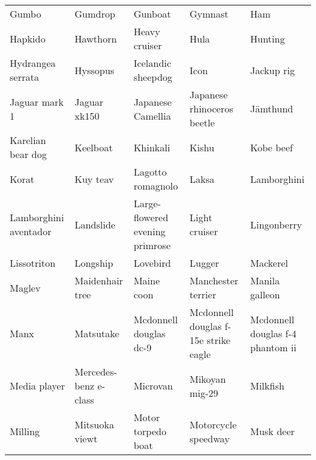 \documentclass[10pt,journal,compsoc]{IEEEtran}
\begin{document}
\begin{table*}[!h]
\begin{tabular}{lllll}
Gumbo                     & Gumdrop                         & Gunboat                           & Gymnast                                    & Ham                                \\
Hapkido                   & Hawthorn                        & Heavy cruiser                     & Hula                                       & Hunting                            \\
Hydrangea serrata         & Hyssopus                        & Icelandic sheepdog                & Icon                                       & Jackup rig                         \\
Jaguar mark 1             & Jaguar xk150                    & Japanese Camellia                 & Japanese rhinoceros beetle                 & Jämthund                           \\
Karelian bear dog         & Keelboat                        & Khinkali                          & Kishu                                      & Kobe beef                          \\
Korat                     & Kuy teav                        & Lagotto romagnolo                 & Laksa                                      & Lamborghini                        \\
Lamborghini aventador     & Landslide                       & Large-flowered evening primrose   & Light cruiser                              & Lingonberry                        \\
Lissotriton               & Longship                        & Lovebird                          & Lugger                                     & Mackerel                           \\
Maglev                    & Maidenhair tree                 & Maine coon                        & Manchester terrier                         & Manila galleon                     \\
Manx                      & Matsutake                       & Mcdonnell douglas dc-9            & Mcdonnell douglas f-15e strike eagle       & Mcdonnell douglas f-4 phantom ii   \\
Media player              & Mercedes-benz e-class           & Microvan                          & Mikoyan mig-29                             & Milkfish                           \\
Milling                   & Mitsuoka viewt                  & Motor torpedo boat                & Motorcycle speedway                        & Musk deer                          \\

\end{tabular}
\end{table*}
\end{document}
